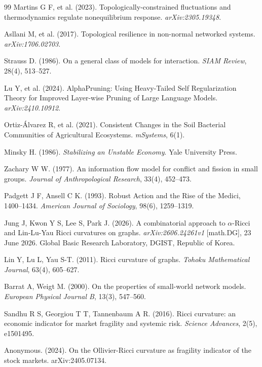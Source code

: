 \documentclass[11pt,a4paper]{article}
\begin{document}
\begin{thebibliography}{99}
Martins G F, et al. (2023).
Topologically-constrained fluctuations and thermodynamics regulate
nonequilibrium response.
\textit{arXiv:2305.19348}.

Asllani M, et al. (2017).
Topological resilience in non-normal networked systems.
\textit{arXiv:1706.02703}.

Strauss D. (1986).
On a general class of models for interaction.
\textit{SIAM Review}, 28(4), 513--527.

Lu Y, et al. (2024).
AlphaPruning: Using Heavy-Tailed Self Regularization Theory for
Improved Layer-wise Pruning of Large Language Models.
\textit{arXiv:2410.10912}.

Ortiz-Álvarez R, et al. (2021).
Consistent Changes in the Soil Bacterial Communities of Agricultural
Ecosystems.
\textit{mSystems}, 6(1).

Minsky H. (1986).
\textit{Stabilizing an Unstable Economy}.
Yale University Press.

Zachary W W. (1977).
An information flow model for conflict and fission in small groups.
\textit{Journal of Anthropological Research}, 33(4), 452--473.

Padgett J F, Ansell C K. (1993).
Robust Action and the Rise of the Medici, 1400--1434.
\textit{American Journal of Sociology}, 98(6), 1259--1319.

Jung J, Kwon Y S, Lee S, Park J. (2026).
A combinatorial approach to $\alpha$-Ricci and Lin-Lu-Yau Ricci
curvatures on graphs.
\textit{arXiv:2606.24261v1} [math.DG], 23 June 2026.
Global Basic Research Laboratory, DGIST, Republic of Korea.

Lin Y, Lu L, Yau S-T. (2011).
Ricci curvature of graphs.
\textit{Tohoku Mathematical Journal}, 63(4), 605--627.

Barrat A, Weigt M. (2000).
On the properties of small-world network models.
\textit{European Physical Journal B}, 13(3), 547--560.

Sandhu R S, Georgiou T T, Tannenbaum A R. (2016).
Ricci curvature: an economic indicator for market fragility and systemic risk.
\textit{Science Advances}, 2(5), e1501495.

Anonymous. (2024).
On the Ollivier-Ricci curvature as fragility indicator of the stock markets.
arXiv:2405.07134.


\end{thebibliography}
\end{document}
